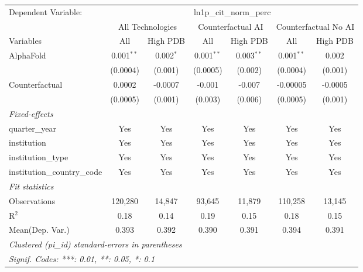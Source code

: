 \begingroup
\centering
\begin{tabular}{lcccccc}
   \tabularnewline \midrule \midrule
   Dependent Variable: & \multicolumn{6}{c}{ln1p\_cit\_norm\_perc}\\
 & \multicolumn{2}{c}{All Technologies} & \multicolumn{2}{c}{Counterfactual AI} & \multicolumn{2}{c}{Counterfactual No AI} \\
\cmidrule(lr){1-1}\cmidrule(lr){2-3} \cmidrule(lr){4-5} \cmidrule(lr){6-7}
Variables & \multicolumn{1}{c}{All} & \multicolumn{1}{c}{High PDB} & \multicolumn{1}{c}{All} & \multicolumn{1}{c}{High PDB} & \multicolumn{1}{c}{All} & \multicolumn{1}{c}{High PDB} \\
\cmidrule(lr){1-1}\cmidrule(lr){2-2} \cmidrule(lr){3-3} \cmidrule(lr){4-4} \cmidrule(lr){5-5} \cmidrule(lr){6-6} \cmidrule(lr){7-7}
   AlphaFold                    & 0.001$^{**}$ & 0.002$^{*}$ & 0.001$^{**}$ & 0.003$^{**}$ & 0.001$^{**}$ & 0.002\\   
                                & (0.0004)     & (0.001)     & (0.0005)     & (0.002)      & (0.0004)     & (0.001)\\   
   Counterfactual               & 0.0002       & -0.0007     & -0.001       & -0.007       & -0.00005     & -0.0005\\   
                                & (0.0005)     & (0.001)     & (0.003)      & (0.006)      & (0.0005)     & (0.001)\\   
   \midrule
   \emph{Fixed-effects}\\
   quarter\_year                & Yes          & Yes         & Yes          & Yes          & Yes          & Yes\\  
   institution                  & Yes          & Yes         & Yes          & Yes          & Yes          & Yes\\  
   institution\_type            & Yes          & Yes         & Yes          & Yes          & Yes          & Yes\\  
   institution\_country\_code   & Yes          & Yes         & Yes          & Yes          & Yes          & Yes\\  
   \midrule
   \emph{Fit statistics}\\
   Observations                 & 120,280      & 14,847      & 93,645       & 11,879       & 110,258      & 13,145\\  
   R$^2$                        & 0.18         & 0.14        & 0.19         & 0.15         & 0.18         & 0.15\\  
Mean(Dep. Var.) & 0.393 & 0.392 & 0.390 & 0.391 & 0.394 & 0.391 \\
   \midrule \midrule
   \multicolumn{7}{l}{\emph{Clustered (pi\_id) standard-errors in parentheses}}\\
   \multicolumn{7}{l}{\emph{Signif. Codes: ***: 0.01, **: 0.05, *: 0.1}}\\
\end{tabular}
\par\endgroup
